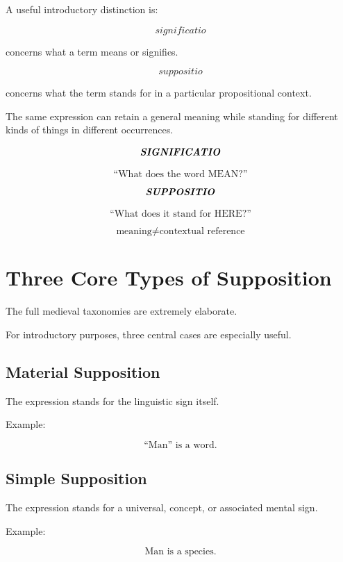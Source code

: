 \documentclass[11pt]{article}
\newcommand{\latin}[1]{\textit{#1}}
\begin{document}
A useful introductory distinction is:

\[
\latin{significatio}
\]

concerns what a term means or signifies.

\[
\latin{suppositio}
\]

concerns what the term stands for in a particular propositional
context.

The same expression can retain a general meaning while standing
for different kinds of things in different occurrences.

\begin{whiteboard}
\[
\textbf{\latin{SIGNIFICATIO}}
\]

\[
\text{``What does the word MEAN?''}
\]

\[
\textbf{\latin{SUPPOSITIO}}
\]

\[
\text{``What does it stand for HERE?''}
\]

\[
\boxed{\text{meaning} \neq \text{contextual reference}}
\]
\end{whiteboard}

\section{Three Core Types of Supposition}

The full medieval taxonomies are extremely elaborate.

For introductory purposes, three central cases are especially
useful.

\subsection*{Material Supposition}

The expression stands for the linguistic sign itself.

Example:

\[
\text{``Man'' is a word.}
\]

\subsection*{Simple Supposition}

The expression stands for a universal, concept, or associated
mental sign.

Example:

\[
\text{Man is a species.}
\]
\end{document}
